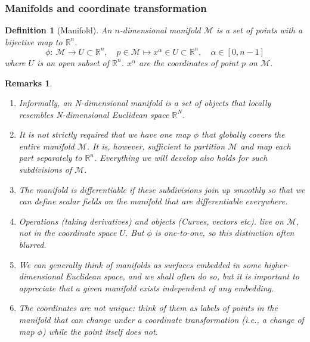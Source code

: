 \documentclass[a4paper]{article}
\newtheorem{remarks}{Remarks}[section]
\theoremstyle{new}
\newtheorem{defi}{Definition}[section]
\begin{document}
\subsubsection{Manifolds and coordinate transformation}
\begin{defi}[Manifold]
An $n$-dimensional manifold $\mathcal{M}$ is a set of points with a bijective map to $\mathbb{R}^n$.
$$\phi:~\mathcal{M}\rightarrow U\subset\mathbb{R}^n,\quad p\in\mathcal{M}\mapsto x^\alpha\in U\subset\mathbb{R}^n,\quad\alpha\in[0,n-1]$$
where $U$ is an open subset of $\mathbb{R}^n$. $x^\alpha$ are the coordinates of point $p$ on $\mathcal{M}$.
\end{defi}
\begin{remarks}\leavevmode
\begin{enumerate}
\item Informally, an N-dimensional manifold is a set of objects that locally resembles N-dimensional Euclidean space $\mathbb{R}^N$.
\item It is not strictly required that we have one map $\phi$ that globally covers the entire manifold $\mathcal{M}$. It is, however, sufficient to partition $\mathcal{M}$ and map each part separately to $\mathbb{R}^n$. Everything we will develop also holds for such subdivisions of $\mathcal{M}$. 
\item The manifold is differentiable if these subdivisions join up smoothly so that we can define scalar fields on the manifold that are differentiable everywhere.
\item Operations (taking derivatives) and objects (Curves, vectors etc). live on $\mathcal{M}$, not in the coordinate space $U$. But $\phi$ is one-to-one, so this distinction often blurred.
\item We can generally think of manifolds as surfaces embedded in some higher-dimensional Euclidean space, and we shall often do so, but it is important to appreciate that a given manifold exists independent of any embedding.
\item The coordinates are not unique: think of them as labels of points in the manifold that can change under a coordinate transformation (i.e., a change of map $\phi$) while the point itself does not.
\end{enumerate}
\end{remarks}
\end{document}
